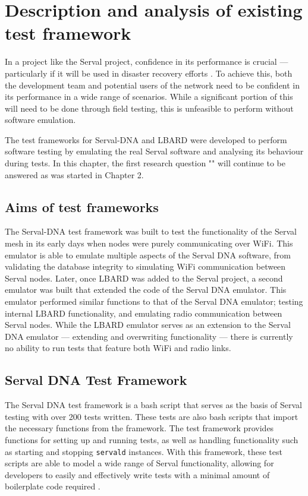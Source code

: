 \chapter{Description and analysis of existing test framework} 
\label{Chapter3} 

In a project like the Serval project, confidence in its performance is crucial — particularly if it will be used in disaster recovery efforts \parencite{gardner2017piloting}.
To achieve this, both the development team and potential users of the network need to be confident in its performance in a wide range of scenarios. 
While a significant portion of this will need to be done through field testing, this is unfeasible to perform without software emulation.

The test frameworks for Serval-DNA and LBARD were developed to perform software testing by emulating the real Serval software and analysing its behaviour during tests.
In this chapter, the first research question "\firstRQ" will continue to be answered as was started in Chapter 2. 


\section{Aims of test frameworks}
The Serval-DNA test framework was built to test the functionality of the Serval mesh in its early days when nodes were purely communicating over WiFi. 
This emulator is able to emulate multiple aspects of the Serval DNA software, from validating the database integrity to simulating WiFi communication between Serval nodes. 
Later, once LBARD was added to the Serval project, a second emulator was built that extended the code of the Serval DNA emulator.
This emulator performed similar functions to that of the Serval DNA emulator; testing internal LBARD functionality, and emulating radio communication between Serval nodes. 
While the LBARD emulator serves as an extension to the Serval DNA emulator — extending and overwriting functionality — there is currently no ability to run tests that feature both WiFi and radio links. 


\section{Serval DNA Test Framework}
The Serval DNA test framework is a bash script that serves as the basis of Serval testing with over 200 tests written.
These tests are also bash scripts that import the necessary functions from the framework. 
The test framework provides functions for setting up and running tests, as well as handling functionality such as starting and stopping \texttt{servald} instances.
With this framework, these test scripts are able to model a wide range of Serval functionality, allowing for developers to easily and effectively write tests with a minimal amount of boilerplate code required \parencite{servalTestDocumentation}.


